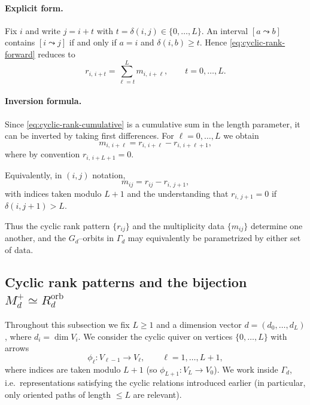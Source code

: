 \documentclass{article}
\theoremstyle{definition}
\begin{document}
\paragraph{Explicit form.}
Fix $i$ and write $j=i+t$ with $t=\delta(i,j)\in\{0,\dots,L\}$.
An interval $[a\leadsto b]$ contains $[i\leadsto j]$
if and only if $a=i$ and $\delta(i,b)\ge t$.
Hence \eqref{eq:cyclic-rank-forward} reduces to
\begin{equation}\label{eq:cyclic-rank-cumulative}
r_{i,\,i+t}
=
\sum_{\ell=t}^{L}
m_{i,\,i+\ell},
\qquad t=0,\dots,L.
\end{equation}

\paragraph{Inversion formula.}
Since \eqref{eq:cyclic-rank-cumulative} is a cumulative sum in the
length parameter, it can be inverted by taking first differences.
For $\ell=0,\dots,L$ we obtain
\begin{equation}\label{eq:cyclic-inversion}
m_{i,\,i+\ell}
=
r_{i,\,i+\ell}
-
r_{i,\,i+\ell+1},
\end{equation}
where by convention $r_{i,\,i+L+1}=0$.

Equivalently, in $(i,j)$ notation,
\[
m_{ij}
=
r_{ij}
-
r_{i,\,j+1},
\]
with indices taken modulo $L+1$ and the understanding that
$r_{i,\,j+1}=0$ if $\delta(i,j+1)>L$.

Thus the cyclic rank pattern $\{r_{ij}\}$ and the multiplicity
data $\{m_{ij}\}$ determine one another, and the $G_d$–orbits in
$\Gamma_d$ may equivalently be parametrized by either set of data.
\subsection{Cyclic rank patterns and the bijection $M_d^+\simeq R_d^{\mathrm{orb}}$}

Throughout this subsection we fix $L\ge 1$ and a dimension vector
$d=(d_0,\dots,d_L)$, where $d_i=\dim V_i$.
We consider the cyclic quiver on vertices $\{0,\dots,L\}$ with arrows
\[
\phi_\ell:V_{\ell-1}\longrightarrow V_\ell,\qquad \ell=1,\dots,L+1,
\]
where indices are taken modulo $L+1$ (so $\phi_{L+1}:V_L\to V_0$).
We work inside $\Gamma_d$, i.e.\ representations satisfying the cyclic relations
introduced earlier (in particular, only oriented paths of length $\le L$
are relevant).
\end{document}
